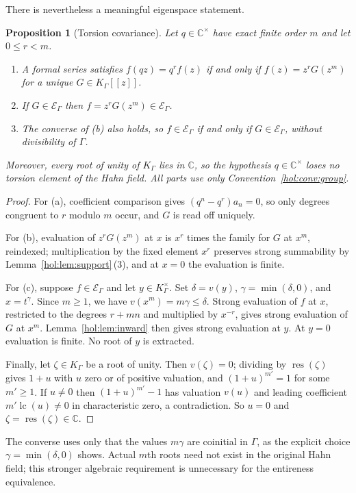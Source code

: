 \documentclass[11pt]{article}
\numberwithin{equation}{section}
\newtheorem{proposition}[theorem]{Proposition}
\theoremstyle{definition}
\theoremstyle{remark}
\newcommand{\C}{\mathbb C}
\newcommand{\K}{K_\Gamma}
\newcommand{\E}{\mathcal E_\Gamma}
\newcommand{\lc}{\operatorname{lc}}
\newcommand{\res}{\operatorname{res}}
\begin{document}
There is nevertheless a meaningful eigenspace statement.

\begin{proposition}[Torsion covariance]\label{hol:prop:torsion}
Let $q\in\C^\times$ have exact finite order $m$ and let $0\le r<m$.
\begin{enumerate}[label=\textup{(\alph*)}]
\item A formal series satisfies $f(qz)=q^rf(z)$ if and only if
$f(z)=z^rG(z^m)$ for a unique $G\in\K[[z]]$.
\item If $G\in\E$ then $f=z^rG(z^m)\in\E$.
\item The converse of \textup{(b)} also holds, so
$f\in\E$ if and only if $G\in\E$, without divisibility of $\Gamma$.
\end{enumerate}
Moreover, every root of unity of $\K$ lies in $\C$, so the hypothesis
$q\in\C^\times$ loses no torsion element of the Hahn field. All parts use only Convention~\ref{hol:conv:group}.
\end{proposition}

\begin{proof}
For (a), coefficient comparison gives $(q^n-q^r)a_n=0$, so only degrees
congruent to $r$ modulo $m$ occur, and $G$ is read off uniquely.

For (b), evaluation of $z^rG(z^m)$ at $x$ is $x^r$ times the family for $G$ at
$x^m$, reindexed; multiplication by the fixed element $x^r$ preserves strong
summability by Lemma~\ref{hol:lem:support}\,(3), and at $x=0$ the evaluation
is finite.

For (c), suppose $f\in\E$ and let $y\in\K^\times$.
Set $\delta=v(y)$, $\gamma=\min(\delta,0)$, and $x=t^\gamma$.
Since $m\ge1$, we have $v(x^m)=m\gamma\le\delta$.
Strong evaluation of $f$ at $x$, restricted to the degrees $r+mn$
and multiplied by $x^{-r}$, gives strong evaluation of $G$ at $x^m$.
Lemma~\ref{hol:lem:inward} then gives strong evaluation at $y$.
At $y=0$ evaluation is finite. No root of $y$ is extracted.

Finally, let $\zeta\in\K$ be a root of unity. Then $v(\zeta)=0$; dividing by
$\res(\zeta)$ gives $1+u$ with $u$ zero or of positive valuation, and
$(1+u)^{m'}=1$ for some $m'\ge1$. If $u\ne0$ then $(1+u)^{m'}-1$ has valuation
$v(u)$ and leading coefficient $m'\lc(u)\ne0$ in characteristic zero, a
contradiction. So $u=0$ and $\zeta=\res(\zeta)\in\C$.
\end{proof}

The converse uses only that the values $m\gamma$ are coinitial in $\Gamma$,
as the explicit choice $\gamma=\min(\delta,0)$ shows. Actual $m$th roots
need not exist in the original Hahn field; this stronger algebraic
requirement is unnecessary for the entireness equivalence.
\end{document}
